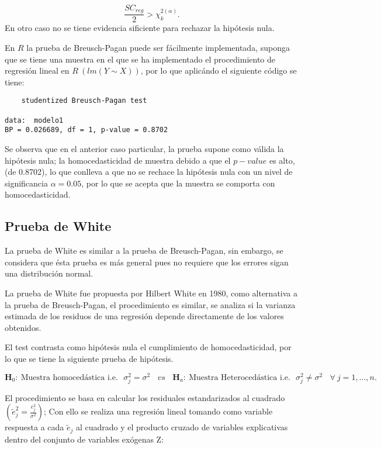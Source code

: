 \documentclass[
  a4paper,
  oneside,
  openany]{book}
\begin{document}
\[\frac{SC_{reg}}{2}> \chi^{2(\alpha)}_{k}.\]
En otro caso no se tiene evidencia sificiente para rechazar la hipótesis nula.

En \(R\) la prueba de Breusch-Pagan puede ser fácilmente implementada, suponga que se tiene una muestra en el que se ha implementado el procedimiento de regresión lineal en \(R \ (lm(Y \sim X))\), por lo que aplicándo el siguiente código se tiene:

\begin{verbatim}
    studentized Breusch-Pagan test

data:  modelo1
BP = 0.026689, df = 1, p-value = 0.8702
\end{verbatim}

Se observa que en el anterior caso particular, la prueba supone como válida la hipótesis nula; la homocedasticidad de muestra debido a que el \(p-value\) es alto, (de 0.8702), lo que conlleva a que no se rechace la hipótesis nula con un nivel de significancia \(\alpha=0.05\), por lo que se acepta que la muestra se comporta con homocedasticidad.

\hypertarget{prueba-de-white}{%
\subsection{Prueba de White}\label{prueba-de-white}}

La prueba de White es similar a la prueba de Breusch-Pagan, sin embargo, se considera que ésta prueba es más general pues no requiere que los errores sigan una distribución normal.

La prueba de White fue propuesta por Hilbert White en 1980, como alternativa a la prueba de Breusch-Pagan, el procedimiento es similar, se analiza si la varianza estimada de los residuos de una regresión depende directamente de los valores obtenidos.

El test contrasta como hipótesis nula el cumplimiento de homocedasticidad, por lo que se tiene la siguiente prueba de hipótesis.

\[\textbf{H}_0: \  \mbox{Muestra homocedástica  i.e.}  \ \ \  \sigma^2_{j}=\sigma^2 \ \ \ \ vs  \ \ \ \
\textbf{H}_a: \  \mbox{Muestra Heterocedástica i.e.}  \ \ \  \sigma^2_{j} \neq \sigma^2  \ \ \ \ \forall  \ j = 1,\ldots,n.\]

El procedimiento se basa en calcular los residuales estandarizados al cuadrado \(\left( \tilde{e}^2_{j}=\frac{e^2_{j}}{\sigma^2}\right)\); Con ello se realiza una regresión lineal tomando como variable respuesta a cada \(\tilde{e}_{j}\) al cuadrado y el producto cruzado de variables explicativas dentro del conjunto de variables exógenas Z:
\end{document}
